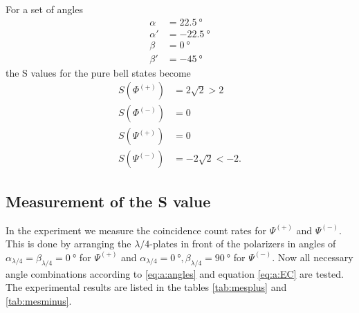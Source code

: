For a set of angles
\begin{subequations}
\label{eq:a:angles}
\begin{align}
\alpha&=\SI{22.5}{\degree}\label{eq:a:angles:a}\\
\alpha'&=\SI{-22.5}{\degree}\label{eq:a:angles:a'}\\
\beta&=\SI{0}{\degree}\label{eq:a:angles:b}\\
\beta'&=\SI{-45}{\degree}\label{eq:a:angles:b'}
\end{align}
\end{subequations}
the S values for the pure bell states become
\begin{subequations}
\label{eq:a:Sbell}
\begin{align}
S(\Phi^{(+)})&=2\sqrt{2}>2\label{eq:a:sbell:phi+}\\
S(\Phi^{(-)})&=0\label{eq:a:sbell:phi-}\\
S(\Psi^{(+)})&=0\label{eq:a:sbell:psi+}\\
S(\Psi^{(-)})&=-2\sqrt{2}<-2.\label{eq:a:sbell:psi-}
\end{align}
\end{subequations}

\subsection{Measurement of the S value}
In the experiment we measure the coincidence count rates for $\Psi^{(+)}$ and $\Psi^{(-)}$.
This is done by arranging the $\lambda/4$-plates in front of the polarizers in angles of $\alpha_{\lambda/4}=\beta_{\lambda/4}=\SI{0}{\degree}$ for $\Psi^{(+)}$ and $\alpha_{\lambda/4}=\SI{0}{\degree},\beta_{\lambda/4}=\SI{90}{\degree}$ for $\Psi^{(-)}$.
Now all necessary angle combinations according to \eqref{eq:a:angles} and equation \eqref{eq:a:EC} are tested.
The experimental results are listed in the tables \vref{tab:mesplus} and \vref{tab:mesminus}.

